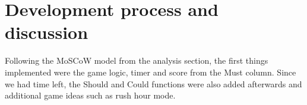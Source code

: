 \section{Development process and discussion}
Following the MoSCoW model from the analysis section, the first things implemented were the game logic, timer and score from the Must column. Since we had time left, the Should and Could functions were also added afterwards and additional game ideas such as rush hour mode.